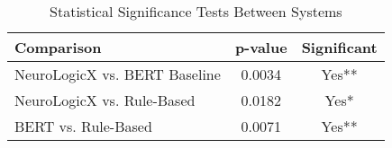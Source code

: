 
\begin{table}[htb]
\centering
\caption{Statistical Significance Tests Between Systems}
\label{tab:significance}
\begin{tabular}{lcc}
\toprule
Comparison & p-value & Significant \\
\midrule
NeuroLogicX vs. BERT Baseline & 0.0034 & Yes** \\
NeuroLogicX vs. Rule-Based & 0.0182 & Yes* \\
BERT vs. Rule-Based & 0.0071 & Yes** \\
\bottomrule
\end{tabular}
\end{table}
